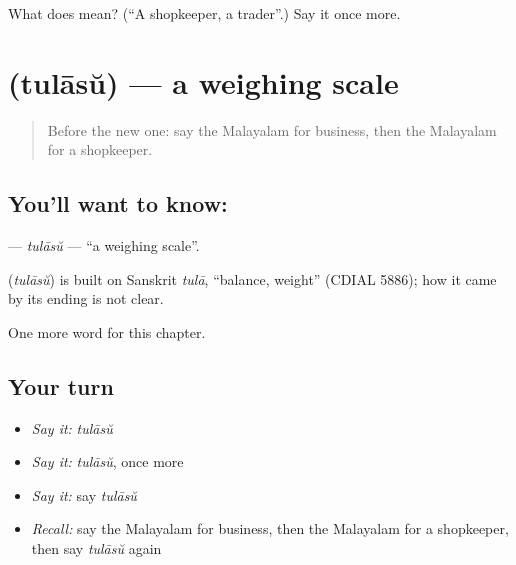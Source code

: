 \begin{tcolorbox}[breakable,colback=teal!4,colframe=teal!35!black,title={Before you move on}]
What does  mean? (\textquotedblleft{}A shopkeeper, a trader\textquotedblright{}.) Say it once more.
\end{tcolorbox}
\section[\texorpdfstring{\ml{തുലാസ്} (tulāsŭ)}{തുലാസ് (tulāsŭ)}]{ (tulāsŭ) — a weighing scale}

\label{lesson:ML-C260-tulasu}



\begin{quote}
Before the new one: say the Malayalam for business, then the Malayalam for a shopkeeper.
\end{quote}

\subsection*{You'll want to know: }
\textbf{} — \emph{tulāsŭ} — \textquotedblleft{}a weighing scale\textquotedblright{}.

\begin{cousinweb}
\textbf{} (\emph{tulāsŭ}) is built on Sanskrit \emph{tulā}, \textquotedblleft{}balance, weight\textquotedblright{} (CDIAL 5886); how it came by its ending is not clear.
\end{cousinweb}

\begin{grammarlens}[title={What you've built}]
One more word for this chapter.
\end{grammarlens}

\subsection*{Your turn}
\begin{itemize}
\raggedright
  \item \emph{Say it:} \emph{tulāsŭ}
  \item \emph{Say it:} \emph{tulāsŭ}, once more
  \item \emph{Say it:} say \emph{tulāsŭ}
  \item \emph{Recall:} say the Malayalam for business, then the Malayalam for a shopkeeper, then say \emph{tulāsŭ} again
\end{itemize}

